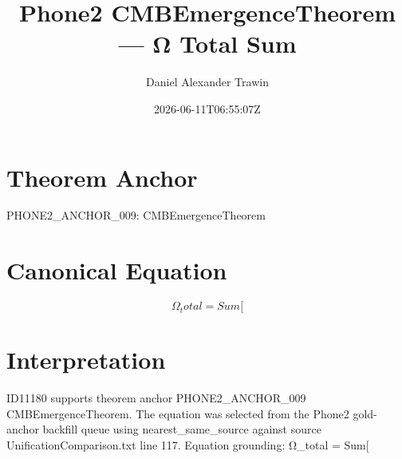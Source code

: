 \documentclass[11pt]{article}
\title{Phone2 CMBEmergenceTheorem — Ω Total Sum}
\author{Daniel Alexander Trawin}
\date{2026-06-11T06:55:07Z}
\begin{document}
\maketitle
\section*{Theorem Anchor}
PHONE2_ANCHOR_009: CMBEmergenceTheorem
\section*{Canonical Equation}
\[
Ω_total = Sum[
\]
\section*{Interpretation}
ID11180 supports theorem anchor PHONE2_ANCHOR_009 CMBEmergenceTheorem. The equation was selected from the Phone2 gold-anchor backfill queue using nearest_same_source against source UnificationComparison.txt line 117. Equation grounding: Ω_total = Sum[
\end{document}
